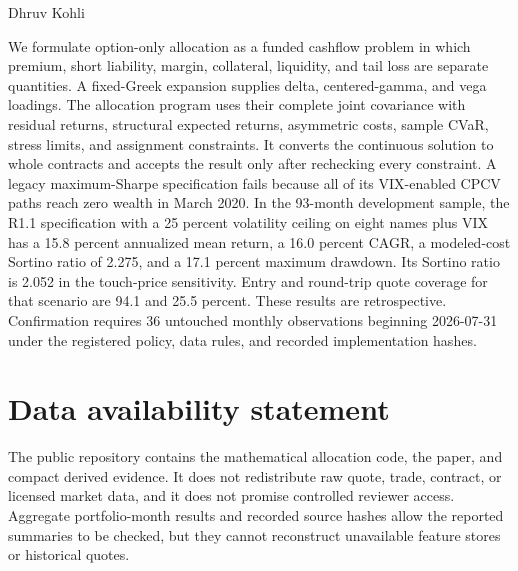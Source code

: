 \documentclass[11pt]{article}
\theoremstyle{definition}
\theoremstyle{remark}
\begin{document}
\thispagestyle{firstpage}

\vspace*{0.35cm}

\vspace{0.28cm}

\noindent Dhruv Kohli

\vspace{0.42cm}

We formulate option-only allocation as a funded cashflow problem in which premium,
short liability, margin, collateral, liquidity, and tail loss are separate quantities.
A fixed-Greek expansion supplies delta, centered-gamma, and vega loadings. The allocation
program uses their complete joint covariance with residual returns, structural expected
returns, asymmetric costs, sample CVaR, stress limits, and assignment constraints. It
converts the continuous solution to whole contracts and accepts the result only after
rechecking every constraint. A legacy maximum-Sharpe specification fails because all of
its VIX-enabled CPCV paths reach zero wealth in March 2020. In the 93-month development
sample, the R1.1 specification with a 25 percent volatility ceiling on eight names plus
VIX has a 15.8 percent annualized mean return, a 16.0 percent CAGR, a modeled-cost Sortino
ratio of 2.275, and a 17.1 percent maximum drawdown. Its Sortino ratio is 2.052 in the
touch-price sensitivity. Entry and round-trip quote coverage for that scenario are 94.1
and 25.5 percent. These results are retrospective. Confirmation requires 36 untouched
monthly observations beginning
2026-07-31 under the registered policy, data rules, and recorded implementation hashes.

\vspace{0.30cm}





\appendix


\clearpage
\section*{Data availability statement}
The public repository contains the mathematical allocation code, the paper, and compact
derived evidence. It does not redistribute raw quote, trade, contract, or licensed market
data, and it does not
promise controlled reviewer access. Aggregate portfolio-month results and recorded source
hashes allow the reported summaries to be checked, but they cannot reconstruct unavailable
feature stores or historical quotes.
\end{document}
